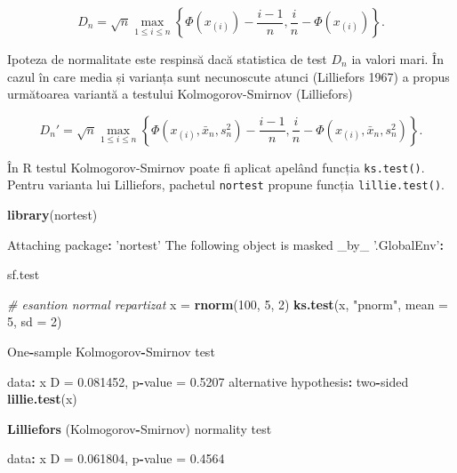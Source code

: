 \documentclass[]{article}
\newenvironment{Shaded}{\begin{snugshade}}{\end{snugshade}}
\newcommand{\KeywordTok}[1]{\textcolor[rgb]{0.13,0.29,0.53}{\textbf{#1}}}
\newcommand{\DataTypeTok}[1]{\textcolor[rgb]{0.13,0.29,0.53}{#1}}
\newcommand{\DecValTok}[1]{\textcolor[rgb]{0.00,0.00,0.81}{#1}}
\newcommand{\FloatTok}[1]{\textcolor[rgb]{0.00,0.00,0.81}{#1}}
\newcommand{\StringTok}[1]{\textcolor[rgb]{0.31,0.60,0.02}{#1}}
\newcommand{\CommentTok}[1]{\textcolor[rgb]{0.56,0.35,0.01}{\textit{#1}}}
\newcommand{\OperatorTok}[1]{\textcolor[rgb]{0.81,0.36,0.00}{\textbf{#1}}}
\newcommand{\NormalTok}[1]{#1}
\begin{document}
\[
  D_n = \sqrt{n}\max_{1\leq i\leq n}\left\{\Phi(x_{(i)})-\frac{i-1}{n}, \frac{i}{n} - \Phi(x_{(i)})\right\}.
\]

Ipoteza de normalitate este respinsă dacă statistica de test \(D_n\) ia
valori mari. În cazul în care media și varianța sunt necunoscute atunci
(Lilliefors 1967) a propus următoarea variantă a testului
Kolmogorov-Smirnov (Lilliefors)

\[
  D_n' = \sqrt{n}\max_{1\leq i\leq n}\left\{\Phi(x_{(i)}, \bar{x}_n, s_n^2)-\frac{i-1}{n}, \frac{i}{n} - \Phi(x_{(i)}, \bar{x}_n, s_n^2)\right\}.
\]

În R testul Kolmogorov-Smirnov poate fi aplicat apelând funcția
\texttt{ks.test()}. Pentru varianta lui Lilliefors, pachetul
\texttt{nortest} propune funcția \texttt{lillie.test()}.

\begin{Shaded}
\begin{Highlighting}[]
\KeywordTok{library}\NormalTok{(nortest)}

\NormalTok{Attaching package}\OperatorTok{:}\StringTok{ 'nortest'}
\NormalTok{The following object is masked _by_ }\StringTok{'.GlobalEnv'}\OperatorTok{:}

\StringTok{    }\NormalTok{sf.test}

\CommentTok{# esantion normal repartizat }
\NormalTok{x =}\StringTok{ }\KeywordTok{rnorm}\NormalTok{(}\DecValTok{100}\NormalTok{, }\DecValTok{5}\NormalTok{, }\DecValTok{2}\NormalTok{)}
\KeywordTok{ks.test}\NormalTok{(x, }\StringTok{"pnorm"}\NormalTok{, }\DataTypeTok{mean =} \DecValTok{5}\NormalTok{, }\DataTypeTok{sd =} \DecValTok{2}\NormalTok{)}

\NormalTok{    One}\OperatorTok{-}\NormalTok{sample Kolmogorov}\OperatorTok{-}\NormalTok{Smirnov test}

\NormalTok{data}\OperatorTok{:}\StringTok{  }\NormalTok{x}
\NormalTok{D =}\StringTok{ }\FloatTok{0.081452}\NormalTok{, p}\OperatorTok{-}\NormalTok{value =}\StringTok{ }\FloatTok{0.5207}
\NormalTok{alternative hypothesis}\OperatorTok{:}\StringTok{ }\NormalTok{two}\OperatorTok{-}\NormalTok{sided}
\KeywordTok{lillie.test}\NormalTok{(x)}

    \KeywordTok{Lilliefors}\NormalTok{ (Kolmogorov}\OperatorTok{-}\NormalTok{Smirnov) normality test}

\NormalTok{data}\OperatorTok{:}\StringTok{  }\NormalTok{x}
\NormalTok{D =}\StringTok{ }\FloatTok{0.061804}\NormalTok{, p}\OperatorTok{-}\NormalTok{value =}\StringTok{ }\FloatTok{0.4564}


\end{Highlighting}
\end{Shaded}
\end{document}
